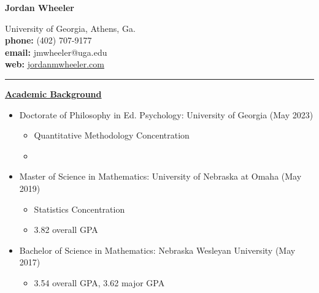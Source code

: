 \documentclass[10pt]{article}
\begin{document}

\begin{center}
\begin{Large}
\textbf{Jordan Wheeler}\\
\end{Large}
{University of Georgia, Athens, Ga.}\\
\textbf{phone:} (402) 707-9177\\
\textbf{email:} jmwheeler@uga.edu\\
\textbf{web:} \href{http://www.jordanmwheeler.com}{jordanmwheeler.com}\\
\noindent\rule{13cm}{0.4pt}
\end{center}


\underline{\textbf{Academic Background}}

\renewcommand\labelitemii{$\circ$}
\renewcommand\labelitemiii{\tiny$\blacksquare$}
\begin{itemize}
\item Doctorate of Philosophy in Ed. Psychology: University of Georgia (May 2023)
\begin{itemize}
\item Quantitative Methodology Concentration
\item 
\end{itemize}
\item Master of Science in Mathematics: University of Nebraska at Omaha (May 2019)
\begin{itemize}
\item Statistics Concentration
\item 3.82 overall GPA 
\end{itemize}
\item Bachelor of Science in Mathematics: Nebraska Wesleyan University (May 2017)
\begin{itemize}
\item 3.54 overall GPA, 3.62 major GPA
\end{itemize}
\end{itemize}
\text{}\\
\end{document}
